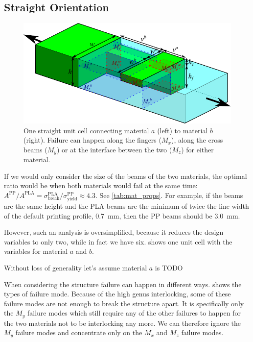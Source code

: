 \subsection{Straight Orientation}

\begin{figure}
	\centering
	\includegraphics[width=\columnwidth]{sources/method/straight_model_v2.pdf}
	\caption{
		One straight unit cell connecting material $a$ (left) to material $b$ (right).
		Failure can happen along the fingers ($M_x$), along the cross beams ($M_y$) or at the interface between the two ($M_z$) for either material.}
	\label{fig:failure_modes}
\end{figure}





If we would only consider the size of the beams of the two materials,
the optimal ratio would be when both materials would fail at the same time:
$
A^\text{PP} / A^\text{PLA} = \sigma^\text{PLA}_\text{break} / \sigma^\text{PP}_\text{yield}  \approx 4.3
$.
See \cref{tab:mat_props}.
For example, if the beams are the same height and the PLA beams are the minimum of twice the line width of the default printing profile, \SI{0.7}{\milli\meter}, 
then the PP beams should be \SI{3.0}{\milli\meter}.

However, such an analysis is oversimplified, because it reduces the design variables to only two,
while in fact we have six.
 shows one unit cell with the variables for material $a$ and $b$.


Without loss of generality let's assume material $a$ is TODO

When considering the structure failure can happen in different ways.
 shows the types of failure mode.
Because of the high genus interlocking, some of these failure modes are not enough to break the structure apart.
It is specifically only the $M_y$ failure modes which still require any of the other failures to happen for the two materials not to be interlocking any more.
We can therefore ignore the $M_y$ failure modes and concentrate only on the $M_x$ and $M_z$ failure modes.

